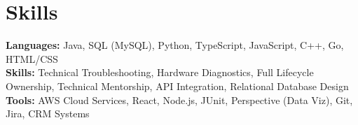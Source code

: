 \documentclass[11pt]{article}       %
\begin{document}
\vspace{-18.5pt}


\section*{Skills}
\textbf{Languages:} Java, SQL (MySQL), Python, TypeScript, JavaScript, C++, Go, HTML/CSS\\
\textbf{Skills:} Technical Troubleshooting, Hardware Diagnostics, Full Lifecycle Ownership, Technical Mentorship, API Integration, Relational Database Design\\
\textbf{Tools:} AWS Cloud Services, React, Node.js, JUnit, Perspective (Data Viz), Git, Jira, CRM Systems\\

\vspace{-6.5pt}
\end{document}
